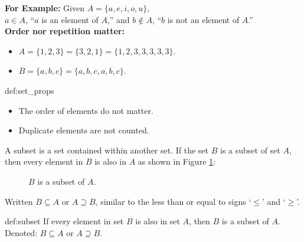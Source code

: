 \noindent
\textbf{For Example:} Given $A = \{a, e, i, o, u\}$,\\
$a \in A$, ``$a$ is an element of $A$,'' and
$b \notin A$, ``$b$ is not an element of $A$.''\\

\noindent
\textbf{Order nor repetition matter:}
\begin{itemize}
    \item $A = \{1, 2, 3\} = \{3, 2, 1\} = \{1, 2, 3, 3, 3, 3, 3\}$.
    \item $B = \{a, b, c\} = \{a, b, c, a, b, c\}$.
\end{itemize}

\begin{Def}{def:set_props}
    \begin{itemize}
        \item The order of elements do not matter.
        \item Duplicate elements are not counted.
    \end{itemize}
\end{Def}


A subset is a set contained within another set. If the set $B$ is a subset of set $A$,
then every element in $B$ is also in $A$ as shown in Figure \ref{fig:subset}:


\begin{figure}[ht]
    \centering
    \hspace{5.5em}
    \caption{$B$ is a subset of $A$.}
    \label{fig:subset}
\end{figure}


\noindent
Written $B \subseteq A$ or $A \supseteq B$, similar to the less than or
equal to signs `$\leq$' and `$\geq$'.

\newpage

\begin{Def}[Subset]{def:subset}
    If every element in set $B$ is also in set $A$, then $B$ is a subset of $A$.\\
    Denoted: $B \subseteq A$ or $A \supseteq B$.
\end{Def}

